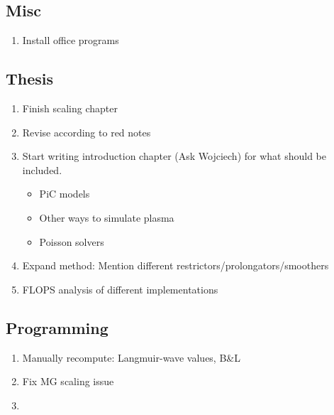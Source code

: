 \subsection{Misc}
    \begin{enumerate}
        \item Install office programs
    \end{enumerate}

\subsection{Thesis}
\begin{enumerate}
  \item Finish scaling chapter
  \item Revise according to red notes
  \item Start writing introduction chapter (Ask Wojciech) for what should be included.
    \begin{itemize}
      \item PiC models
      \item Other ways to simulate plasma
      \item Poisson solvers
    \end{itemize}
  \item Expand method: Mention different restrictors/prolongators/smoothers
  \item FLOPS analysis of different implementations
\end{enumerate}

\subsection{Programming}
\begin{enumerate}
  \item Manually recompute: Langmuir-wave values, B&L
  \item Fix MG scaling issue
  \item
\end{enumerate}
